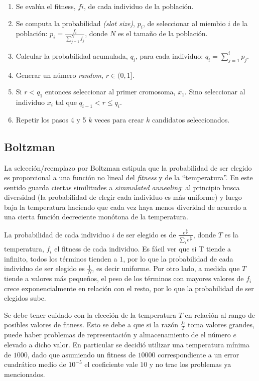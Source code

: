 \documentclass[%
    final,
    reprint,
    notitlepage,
    narroweqnarray,
    inline,
    twoside,
    invited
    ]{ieee}
\begin{document}
\begin{enumerate}

\item Se evalúa el fitness, $fi$, de cada individuo de la población.
\item Se computa la probabilidad \textit{(slot size)}, $p_i$, de seleccionar al miembio $i$ de la población:	$p_i=\frac{f_i}{\sum_{j=1}^{N}{f_j}}$, donde $N$ es el tamaño de la población.
\item Calcular la probabilidad acumulada, $q_i$, para cada individuo: $q_i=\sum_{j=1}^{i}{p_j}$.
\item Generar un número \textit{random}, $r \in (0, 1]$.
\item Si $r < q_1$ entonces seleccionar al primer cromosoma, $x_1$. Sino seleccionar al individuo $x_i$ tal que $q_{i-1} < r \leq q_i$. 
\item Repetir los pasos 4 y 5 $k$ veces para crear $k$ candidatos seleccionados.
\end{enumerate}

\subsection{Boltzman}

\par La selección/reemplazo por Boltzman estipula que la probabilidad 
de ser elegido es proporcional a una función no 
lineal del \textit{fitness} y de la ``temperatura''. 
En este sentido guarda ciertas similitudes a \textit{simmulated annealing}: al 
principio busca diversidad (la probabilidad de elegir cada individuo es más uniforme) 
y luego baja la temperatura haciendo que cada 
vez haya menos diveridad de acuerdo a una cierta función decreciente monótona de la temperatura. 
\par La probabilidad de cada individuo $i$ de ser elegido es de $ \frac{e^{\frac{f_i}{T}}}{\sum_{i}e^{\frac{f_i}{T}}}$, 
donde $T$ es la temperatura, $f_i$ el fitness de cada individuo. Es fácil ver que si T tiende a infinito, todos 
los términos tienden a $1$, por lo que la probabilidad de cada individuo de ser elegido es $\frac{1}{N}$, es decir 
uniforme. Por otro lado, a medida que $T$ tiende a valores más pequeños, el peso de los términos con mayores 
valores de $f_i$ crece exponencialmente en relación con el resto, por lo que la probabilidad de ser elegidos 
sube. 
\par Se debe tener cuidado con la elección de la temperatura $T$ en relación al rango de posibles valores de 
fitness. Esto se debe a que si la razón $\frac{f_i}{T}$ toma valores grandes, puede haber problemas 
de representación y almacenamiento de el número $e$ elevado a dicho valor. En particular se decidió utilizar 
una temperatura mínima de $1000$, dado que asumiendo un fitness de $10000$ correspondiente a un error 
cuadrático medio de $10^{-5}$ el coeficiente vale $10$ y no trae los problemas ya mencionados.
\end{document}
